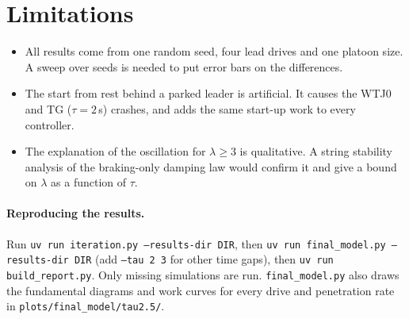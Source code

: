 \documentclass[11pt]{article}
\begin{document}
\section{Limitations}
\begin{itemize}
\item All results come from one random seed, four lead drives and one platoon size. A sweep over seeds is
  needed to put error bars on the differences.
\item The start from rest behind a parked leader is artificial. It causes the WTJ0 and TG ($\tau=2$\,s)
  crashes, and adds the same start-up work to every controller.
\item The explanation of the oscillation for $\lambda\ge3$ is qualitative. A string stability analysis of
  the braking-only damping law would confirm it and give a bound on $\lambda$ as a function of $\tau$.
\end{itemize}

\paragraph{Reproducing the results.}
Run \texttt{uv run iteration.py --results-dir DIR}, then \texttt{uv run final\_model.py --results-dir DIR}
(add \texttt{--tau 2 3} for other time gaps), then \texttt{uv run build\_report.py}. Only missing
simulations are run. \texttt{final\_model.py} also draws the fundamental diagrams and work curves for
every drive and penetration rate in \texttt{plots/final\_model/tau2.5/}.
\end{document}
